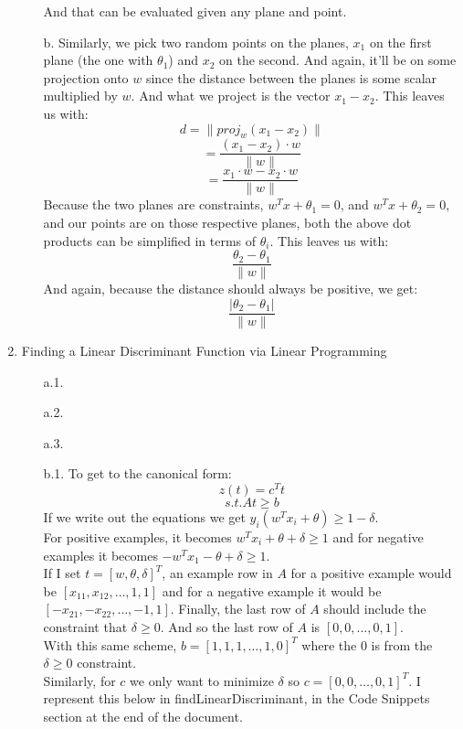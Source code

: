 \begin{enumerate}
\begin{enumerate}
			And that can be evaluated given any plane and point.
		\item[b.]
			Similarly, we pick two random points on the planes, $x_1$ on the first plane (the one with $\theta _1$) and $x_2$ on the second. And again, it'll be on some projection onto $w$ since the distance between the planes is some scalar multiplied by $w$. And what we project is the vector $x_1-x_2$. This leaves us with:
			$$d=\|proj_{w}(x_1-x_2)\|$$
			$$=\frac{(x_1-x_2)\cdot w}{\|w\|}$$
			$$=\frac{x_1 \cdot w - x_2 \cdot w}{\|w\|}$$
			Because the two planes are constraints, $w^T x + \theta _1 = 0$, and $w^T x + \theta _2 = 0$, and our points are on those respective planes, both the above dot products can be simplified in terms of $\theta _i$. This leaves us with:
			$$\frac{\theta _2 - \theta _1}{\|w\|}$$
			And again, because the distance should always be positive, we get:
			$$\frac{|\theta _2 - \theta _1|}{\|w\|}$$
	\end{enumerate}
\item Finding a Linear Discriminant Function via Linear Programming
      \begin{enumerate}
        \item[a.1.]
        \item[a.2.]
        \item[a.3.]
        \item[b.1.]
                To get to the canonical form:
                   $$z(t) = c^Tt$$
                   $$s.t. At \geq b$$
                If we write out the equations we get $y_i(w^Tx_i+\theta) \geq 1-\delta$. \\
                For positive examples, it becomes $w^Tx_i+\theta+\delta \geq 1$ and for negative examples it becomes $-w^Tx_1-\theta+\delta \geq 1$.\\          
                If I set $t = [w,\theta,\delta]^T$, an example row in $A$ for a positive example would be $[x_{11},x_{12},\ldots,1,1]$ and for a negative example it would be $[-x_{21},-x_{22},\ldots,-1,1]$. Finally, the last row of $A$ should include the constraint that $\delta \geq 0$. And so the last row of $A$ is $[0,0,\ldots,0,1]$. \\
                With this same scheme, $b = [1,1,1,\ldots,1,0]^T$ where the 0 is from the $\delta \geq 0$ constraint.\\
                Similarly, for $c$ we only want to minimize $\delta$ so $c=[0,0,\ldots,0,1]^T$. I represent this below in findLinearDiscriminant, in the Code Snippets section at the end of the document.\\


\end{enumerate}
\end{enumerate}
